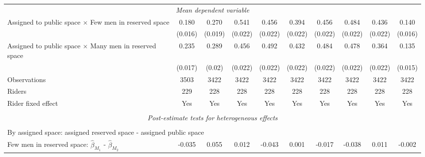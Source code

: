 \begin{tabular}{l*{9}{c}}
\multicolumn{10}{c}{\textit{Mean dependent variable}} \\ Assigned to public space $\times$ Few men in reserved space&       0.180         &       0.270         &       0.541         &       0.456         &       0.394         &       0.456         &       0.484         &       0.436         &       0.140         \\
\,                  &     (0.016)         &     (0.019)         &     (0.022)         &     (0.022)         &     (0.022)         &     (0.022)         &     (0.022)         &     (0.022)         &     (0.016)         \\
Assigned to public space $\times$ Many men in reserved space&       0.235         &       0.289         &       0.456         &       0.492         &       0.432         &       0.484         &       0.478         &       0.364         &       0.135         \\
\,                  &     (0.017)         &      (0.02)         &     (0.022)         &     (0.022)         &     (0.022)         &     (0.022)         &     (0.022)         &     (0.022)         &     (0.015)         \\
Observations        &        3503         &        3422         &        3422         &        3422         &        3422         &        3422         &        3422         &        3422         &        3422         \\
Riders              &         229         &         228         &         228         &         228         &         228         &         228         &         228         &         228         &         228         \\
Rider fixed effect  &         Yes         &         Yes         &         Yes         &         Yes         &         Yes         &         Yes         &         Yes         &         Yes         &         Yes         \\
\hline \\[-1ex]  \multicolumn{10}{c}{\textit{Post-estimate tests for heterogeneous effects}} \\\\[-1ex] \multicolumn{10}{l}{By assigned space: assigned reserved space - assigned public space} \\ \quad Few men in reserved space: $\hat\beta_{M_1}$ - $\hat\beta_{M_2}$&      -0.035         &       0.055         &       0.012         &      -0.043         &       0.001         &      -0.017         &      -0.038         &       0.011         &      -0.002         \\

\end{tabular}

